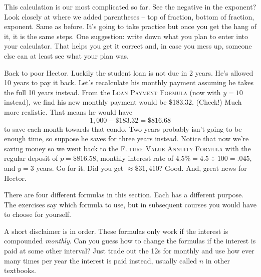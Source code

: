 This calculation is our most complicated so far. See the negative in the exponent? Look closely at where we added parentheses -- top of fraction, bottom of fraction, exponent.  Same as before.  It's going to take practice but once you get the hang of it, it is the same steps.  One suggestion: write down what you plan to enter into your calculator.  That helps you get it correct and, in case you mess up, someone else can at least see what your plan was. 

Back to poor Hector. Luckily the student loan is not due in 2 years.  He's allowed 10 years to pay it back.  Let's recalculate his monthly payment assuming he takes the full 10 years instead. From the  \textsc{Loan Payment Formula} (now with $y=10$ instead), we find his new monthly payment would be \$183.32.  (Check!)
Much more realistic.  That means he would have $$1,000 - \$183.32 = \$816.68$$ to save each month towards that condo.  Two years probably isn't going to be enough time, so suppose he saves for three years instead. Notice that now we're saving money so we went back to the \textsc{Future Value Annuity Formula} with the regular deposit of $p=\$816.58$, monthly interest rate of $4.5\% = 4.5 \div 100 = .045$, and $y=3$ years.  
Go for it.  Did you get $ \approx \$31,410$?  Good.  And, great news for Hector.

There are four different formulas in this section.  Each has a different purpose.  The exercises say which formula to use, but in subsequent courses you would have to choose for yourself.  

A short disclaimer is in order.  These formulas only work if the interest is compounded \emph{monthly}.  Can you guess how to change the formulas if the interest is paid at some other interval?  Just trade out the 12s for monthly and use how ever many times per year the interest is paid instead, usually called $n$ in other textbooks.


%